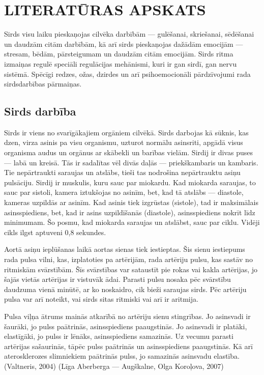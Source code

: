 \documentclass[12pt]{article}
\begin{document}
\section{LITERATŪRAS APSKATS}

Sirds visu laiku pieskaņojas cilvēka darbībām --- gulēšanai, skriešanai, sēdēšanai un dau\-dzām citām darbībām, kā arī sirds pieskaņojas dažādām emocijām — stresam, bēdām, pārstei\-gumam un daudzām citām emocijām. Sirds ritma izmaiņas regulē speciāli regulācijas mehānis\-mi, kuri ir gan sirdī, gan nervu sistēmā. Spēcīgi redzes, ožas, dzirdes un arī psihoemocionāli pārdzīvojumi rada sirdsdarbības pārmaiņas. 

\subsection{Sirds darbība}

Sirds ir viens no svarīgākajiem orgāniem cilvēkā. Sirds darbojas kā sūknis, kas dzen, virza asinis pa visu organismu, uzturot normālu asinsriti, apgādā visus organisma audus un orgānus ar skābekli un barības vielām. Sirdij ir divas puses — labā un kreisā. Tās ir sadalītas vēl divās daļās — priekškambaris un kambaris. Tie nepārtraukti saraujas un atslābs, tieši tas nodrošina nepārtrauktu asiņu pulsāciju. Sirdij ir muskulis, kuru sauc par miokardu. Kad miokarda saraujas, to sauc par sistoli, kamera iztukšojas no asinīm, bet, kad tā atslābs — diastole, kameras uzpildās ar asinīm. Kad asinis tiek izgrūstas (sistole), tad ir maksimālais asinsspiediens, bet, kad ir asins uzpildīšanās (diastole), asinsspiediens nokrīt līdz minimumam. Šo posmu, kad miokarda saraujas un atslābst, sauc par ciklu. Vidēji cikls ilgst aptuveni 0,8 sekundes.\par
Aortā asiņu ieplūšanas laikā aortas sienas tiek iestieptas. Šis sienu iestiepums rada pulsa vilni, kas, izplatoties pa artērijām, rada artēriju pulsu, kas sastāv no ritmiskām svārstībām. Šīs svārstības var sataustīt pie rokas vai kakla artērijas, jo šajās vietās artērijas ir vistuvāk ādai. Parasti pulsu nosaka pēc svārstību daudzuma vienā minūtē, ar ko noskaidro, cik bieži saraujas sirds. Pēc artēriju pulsa var arī noteikt, vai sirds sitas ritmiski vai arī ir aritmija. \par
Pulsa viļņa ātrums mainās atkarībā no artēriju sienu stingrības. Jo asinsvadi ir šaurāki, jo pulss paātrinās, asinsspiediens paaugstinās. Jo asinsvadi ir platāki, elastīgāki, jo pulss ir lēnāks, asinsspiediens samazinās. Uz vecumu parasti artērijas sašaurinās, tāpēc pulss paātrinās un asinsspiediens paaugstinās. Kā arī aterosklerozes slimniekiem paātrinās pulss, jo samazinās asinsvadu elastība. 
(Valtneris, 2004) (Līga Aberberga — Augškalne, Olga Koroļova, 2007)
\end{document}
